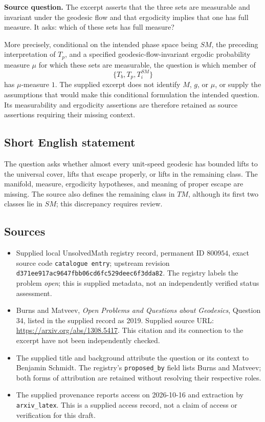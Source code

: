 \documentclass[11pt]{article}
\begin{document}
\textbf{Source question.} The excerpt asserts that the three sets are measurable and invariant under the geodesic flow and that ergodicity implies that one has full measure. It asks: which of these sets has full measure?

More precisely, conditional on the intended phase space being \(SM\), the preceding interpretation of \(T_p\), and a specified geodesic-flow-invariant ergodic probability measure \(\mu\) for which these sets are measurable, the question is which member of
\[
\{T_b,T_p,T_i^{SM}\}
\]
has \(\mu\)-measure \(1\). The supplied excerpt does not identify \(M\), \(g\), or \(\mu\), or supply the assumptions that would make this conditional formulation the intended question. Its measurability and ergodicity assertions are therefore retained as source assertions requiring their missing context.
\subsection{Short English statement}
The question asks whether almost every unit-speed geodesic has bounded lifts to the universal cover, lifts that escape properly, or lifts in the remaining class. The manifold, measure, ergodicity hypotheses, and meaning of proper escape are missing. The source also defines the remaining class in \(TM\), although its first two classes lie in \(SM\); this discrepancy requires review.
\subsection{Sources}
\begin{itemize}
\item Supplied local UnsolvedMath registry record, permanent ID \(800954\), exact source code \texttt{catalogue entry}; upstream revision \texttt{d371ee917ac9647fbb06cd6fc529deec6f3dda82}. The registry labels the problem \emph{open}; this is supplied metadata, not an independently verified status assessment.
\item Burns and Matveev, \emph{Open Problems and Questions about Geodesics}, Question 34, listed in the supplied record as 2019. Supplied source URL: \url{https://arxiv.org/abs/1308.5417}. This citation and its connection to the excerpt have not been independently checked.
\item The supplied title and background attribute the question or its context to Benjamin Schmidt. The registry's \texttt{proposed\_by} field lists Burns and Matveev; both forms of attribution are retained without resolving their respective roles.
\item The supplied provenance reports access on 2026-10-16 and extraction by \texttt{arxiv\_latex}. This is a supplied access record, not a claim of access or verification for this draft.
\end{itemize}
\end{document}

